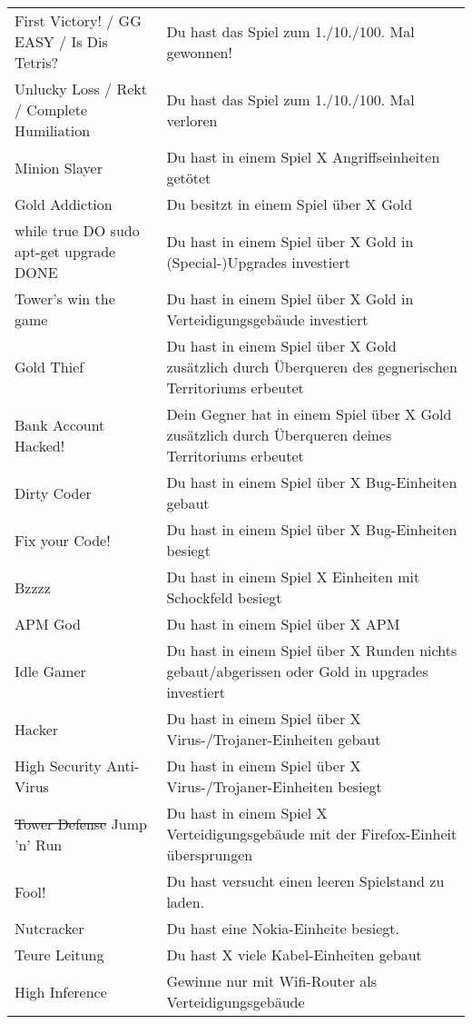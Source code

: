 \begin{table}[ht]
\begin{longtabu}{X[-1]X}
    First Victory! / GG EASY / Is Dis Tetris?
      & Du hast das Spiel zum 1./10./100. Mal gewonnen!
      	\\
    Unlucky Loss / Rekt / Complete Humiliation
    	& Du hast das Spiel zum 1./10./100. Mal verloren
    	\\
	Minion Slayer
		& Du hast in einem Spiel X Angriffseinheiten getötet
		\\
	Gold Addiction
		& Du besitzt in einem Spiel über X Gold
		\\
	while true DO sudo apt-get upgrade DONE
		& Du hast in einem Spiel über X Gold in (Special-)Upgrades investiert
		\\
	Tower's win the game
		& Du hast in einem Spiel über X Gold in Verteidigungsgebäude investiert
		\\
	Gold Thief
		& Du hast in einem Spiel über X Gold zusätzlich durch Überqueren des gegnerischen
		Territoriums erbeutet
		\\
	Bank Account Hacked!
		& Dein Gegner hat in einem Spiel über X Gold zusätzlich durch Überqueren deines
		Territoriums erbeutet
		\\
	Dirty Coder
		& Du hast in einem Spiel über X Bug-Einheiten gebaut
		\\
	Fix your Code!
		& Du hast in einem Spiel über X Bug-Einheiten besiegt
		\\
	Bzzzz
		& Du hast in einem Spiel X Einheiten mit Schockfeld besiegt
		\\
	APM God
		& Du hast in einem Spiel über X APM
		\\
	Idle Gamer
		& Du hast in einem Spiel über X Runden nichts gebaut/abgerissen oder Gold in upgrades investiert
		\\
	Hacker
		& Du hast in einem Spiel über X Virus-/Trojaner-Einheiten gebaut
		\\
	High Security Anti-Virus
		& Du hast in einem Spiel über X Virus-/Trojaner-Einheiten besiegt
		\\
	\st{Tower Defense} Jump 'n' Run
		& Du hast in einem Spiel X Verteidigungsgebäude mit der Firefox-Einheit übersprungen
		\\
	Fool!
		& Du hast versucht einen leeren Spielstand zu laden.
		\\
	Nutcracker
		& Du hast eine Nokia-Einheite besiegt.
		\\
	Teure Leitung
		& Du hast X viele Kabel-Einheiten gebaut
		\\
	High Inference
		& Gewinne nur mit Wifi-Router als Verteidigungsgebäude
		\\
    \bottomrule
  \end{longtabu}
\end{table}
